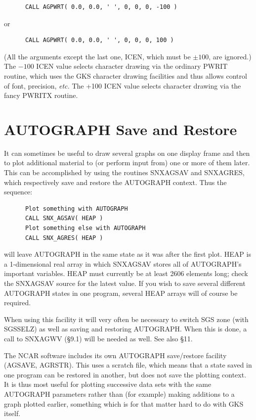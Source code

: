 \documentclass[twoside,11pt]{article}
\renewcommand{\_}{\texttt{\symbol{95}}}
\begin{document}
\begin{verbatim}
      CALL AGPWRT( 0.0, 0.0, ' ', 0, 0, 0, -100 )
\end{verbatim}

or

\begin{verbatim}
      CALL AGPWRT( 0.0, 0.0, ' ', 0, 0, 0, 100 )
\end{verbatim}

(All the arguments except the last one, ICEN, which must be $\pm100$,
are ignored.)
The $-100$ ICEN value selects character drawing via
the ordinary PWRIT routine, which uses the GKS character drawing
facilities and thus allows control of font, precision, {\em etc.}
The +100 ICEN value selects character drawing via the fancy PWRITX routine.


\section {AUTOGRAPH Save and Restore}

It can sometimes be useful to draw several graphs on one
display frame and then to plot additional material to (or
perform input from) one or more of them later.
This can be accomplished by using the
routines SNX\_AGSAV and SNX\_AGRES, which respectively
save and restore the AUTOGRAPH context.  Thus the sequence:

\begin{verbatim}
      Plot something with AUTOGRAPH
      CALL SNX_AGSAV( HEAP )
      Plot something else with AUTOGRAPH
      CALL SNX_AGRES( HEAP )
\end{verbatim}

will leave AUTOGRAPH in the same state as it was after the first plot.
HEAP is a 1-dimensional real array in which SNX\_AGSAV stores
all of AUTOGRAPH's important variables.
HEAP must currently be at least 2606 elements long;
check the SNX\_AGSAV source for the latest value.
If you wish to save several different AUTOGRAPH states in
one program, several HEAP arrays will of course be required.

When using this facility it will very often be necessary to switch SGS zone
(with SGS\_SELZ) as well as saving and restoring AUTOGRAPH.
When this is done, a call to SNX\_AGWV (\S 9.1) will be needed as well.
See also \S 11.

The NCAR software includes its own AUTOGRAPH save/restore facility (AGSAVE,
AGRSTR).
This uses a scratch file, which means that a state saved in one program can be
restored in another, but does not save the plotting context.
It is thus most useful for plotting successive data sets with the same
AUTOGRAPH parameters rather than (for example) making additions to a graph
plotted earlier, something which is for that matter hard to do with GKS itself.
\end{document}
